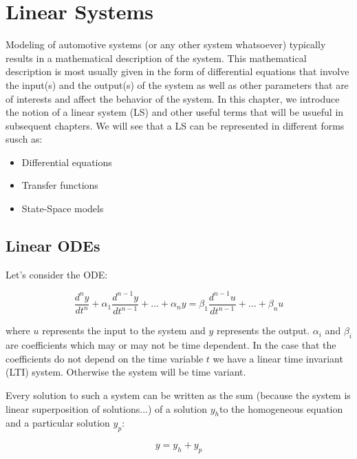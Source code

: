 \chapter{Linear Systems}
\label{linear_systems}
Modeling of automotive systems (or any other system whatsoever) typically results in a mathematical description of the system. This mathematical description is most usually given in the
form of differential equations that involve the input(s) and the output(s) of the system as well as other parameters that are of interests and affect the behavior of the system. In this chapter,
we introduce the notion of a linear system (LS) and other useful terms that will be usueful in subsequent chapters. We will see that a LS can be represented in different forms susch as:


\begin{itemize}

\item Differential equations
\item Transfer functions
\item State-Space models

\end{itemize} 

\section{Linear ODEs}

Let's consider the ODE:

\begin{equation}
\frac{d^{n}y}{dt^{n}} + \alpha_{1}\frac{d^{n-1}y}{dt^{n-1}} + \dots + \alpha_{n}y = \beta_{1}\frac{d^{n-1}u}{dt^{n-1}} + \dots + \beta_{n}u  
\label{linear_sys_1}
\end{equation}

where $u$ represents the input to the system and $y$ represents the output. $\alpha_i$ and $\beta_i$ are coefficients which may or may not be time dependent. In the case that the coefficients do not depend on
the time variable $t$ we have a linear time invariant (LTI) system. Otherwise the system will be time variant.

Every solution to such a system can be written as the sum (because the system is linear superposition of solutions...) of a solution $y_h$to the homogeneous equation and a particular solution $y_p$:


\begin{equation}
y = y_h + y_p
\label{linear_sys_general_sol}
\end{equation}

